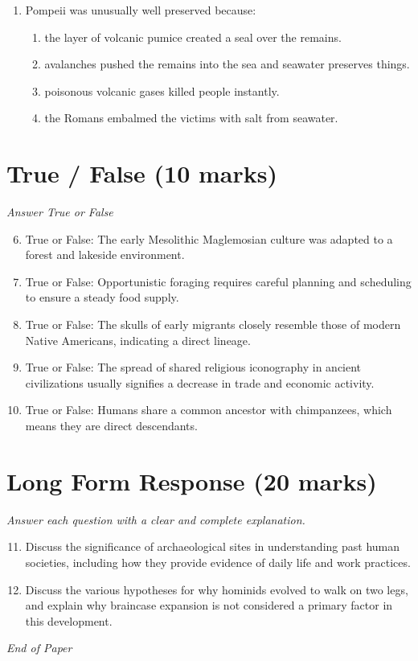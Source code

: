 \documentclass[12pt]{article}
\begin{document}
\begin{enumerate}[label=\arabic*.]
\begin{enumerate}[label=(\alph*)]
    \item tens of millions
\end{enumerate}
\item Pompeii was unusually well preserved because:
\begin{enumerate}[label=(\alph*)]
    \item the layer of volcanic pumice created a seal over the remains.
    \item avalanches pushed the remains into the sea and seawater preserves things.
    \item poisonous volcanic gases killed people instantly.
    \item the Romans embalmed the victims with salt from seawater.
\end{enumerate}
\end{enumerate}

\section*{True / False (10 marks)}
\textit{Answer True or False}
\begin{enumerate}[label=\arabic*.]
\setcounter{enumi}{5}
\item True or False: The early Mesolithic Maglemosian culture was adapted to a forest and lakeside environment.
\item True or False: Opportunistic foraging requires careful planning and scheduling to ensure a steady food supply.
\item True or False: The skulls of early migrants closely resemble those of modern Native Americans, indicating a direct lineage.
\item True or False: The spread of shared religious iconography in ancient civilizations usually signifies a decrease in trade and economic activity.
\item True or False: Humans share a common ancestor with chimpanzees, which means they are direct descendants.
\end{enumerate}

\section*{Long Form Response (20 marks)}
\textit{Answer each question with a clear and complete explanation.}
\begin{enumerate}[label=\arabic*.]
\setcounter{enumi}{10}
\item Discuss the significance of archaeological sites in understanding past human societies,
including how they provide evidence of daily life and work practices.
\item Discuss the various hypotheses for why hominids evolved to walk on two legs, and explain
why braincase expansion is not considered a primary factor in this development.
\end{enumerate}

\vfill
\noindent\textit{End of Paper}
\end{document}

